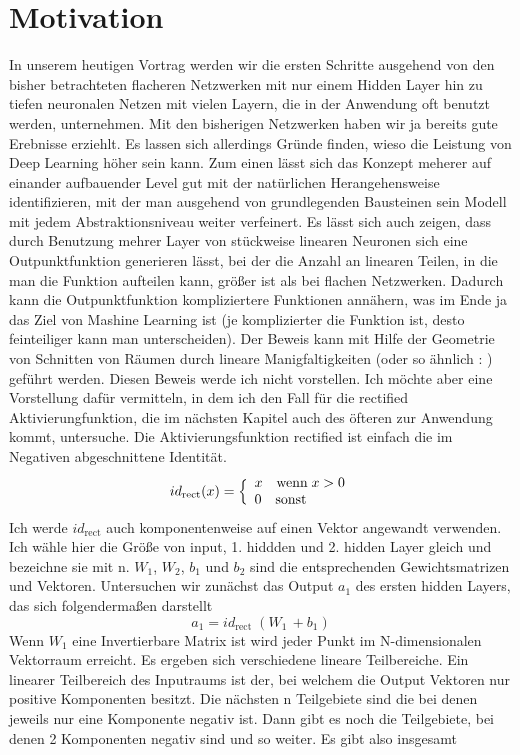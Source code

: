 \documentclass[12pt]{article}
\begin{document}
\section*{Motivation}
In unserem heutigen Vortrag werden wir die ersten Schritte ausgehend von den bisher betrachteten flacheren Netzwerken mit nur einem Hidden Layer hin zu tiefen neuronalen Netzen mit vielen Layern, die in der Anwendung oft benutzt werden, unternehmen. Mit den bisherigen Netzwerken haben wir ja bereits gute Erebnisse erziehlt. Es lassen sich allerdings Gründe finden, wieso die Leistung von Deep Learning höher sein kann. Zum einen lässt sich das Konzept meherer auf einander aufbauender Level gut mit der natürlichen Herangehensweise identifizieren, mit der man ausgehend von grundlegenden Bausteinen sein Modell mit jedem Abstraktionsniveau weiter verfeinert.\newline
Es lässt sich auch zeigen, dass durch Benutzung mehrer Layer von stückweise linearen Neuronen sich eine Outpunktfunktion generieren lässt, bei der die Anzahl an linearen Teilen, in die man die Funktion aufteilen kann, größer ist als bei flachen Netzwerken. Dadurch kann die Outpunktfunktion kompliziertere Funktionen annähern, was im Ende ja das Ziel von Mashine Learning ist (je komplizierter die Funktion ist, desto feinteiliger kann man unterscheiden). Der Beweis kann mit Hilfe der Geometrie von Schnitten von Räumen durch lineare Manigfaltigkeiten (oder so ähnlich : ) geführt werden. Diesen Beweis werde ich nicht vorstellen. Ich möchte aber eine Vorstellung dafür vermitteln, in dem ich den Fall für die rectified Aktivierungfunktion, die im nächsten Kapitel auch des öfteren zur Anwendung kommt, untersuche. Die Aktivierungsfunktion rectified ist einfach die im Negativen abgeschnittene Identität.
$$id_\text{rect}(x)=\Bigl\{\begin{array}{l}x\quad\text{wenn}\;x>0\\
        0\quad\text{sonst}\end{array}$$
Ich werde $id_\text{rect}$ auch komponentenweise auf einen Vektor angewandt verwenden. Ich wähle hier die Größe von input, 1. hiddden und 2. hidden Layer gleich und bezeichne sie mit n. $W_1$, $W_2$, $b_1$ und $b_2$ sind die entsprechenden Gewichtsmatrizen und Vektoren. Untersuchen wir zunächst das Output $a_1$ des ersten hidden Layers, das sich folgendermaßen darstellt
$$a_1=id_\text{rect}\;\left(W_1\,+b_1\right)$$
Wenn $W_1$ eine Invertierbare Matrix ist wird jeder Punkt im N-dimensionalen Vektorraum erreicht. Es ergeben sich verschiedene lineare Teilbereiche. Ein linearer Teilbereich des Inputraums ist der, bei welchem die Output Vektoren nur positive Komponenten besitzt. Die nächsten n Teilgebiete sind die bei denen jeweils nur eine Komponente negativ ist. Dann gibt es noch die Teilgebiete, bei denen 2 Komponenten negativ sind und so weiter. Es gibt also insgesamt 
\end{document}
